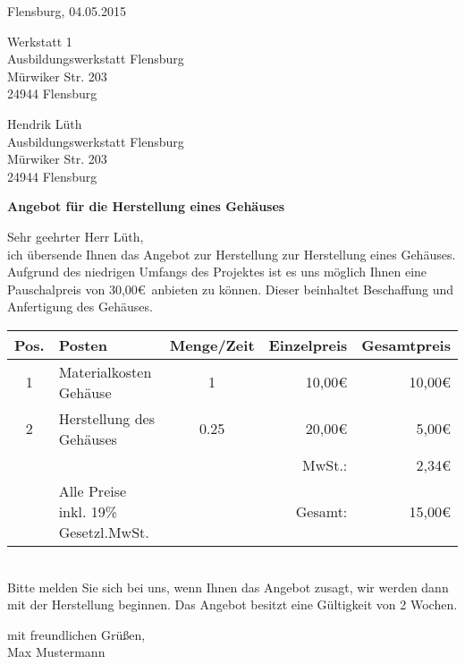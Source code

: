 \pagebreak
Flensburg, 04.05.2015
\begin{flushright}
Werkstatt 1\\
Ausbildungswerkstatt Flensburg\\
Mürwiker Str. 203\\
24944 Flensburg
\end{flushright}
\bigskip
\bigskip
\bigskip
Hendrik Lüth\\
Ausbildungswerkstatt Flensburg\\
Mürwiker Str. 203\\
24944 Flensburg\\
\begin{flushleft}
\bigskip

\textbf{Angebot für die Herstellung eines Gehäuses}
\bigskip
\bigskip

Sehr geehrter Herr Lüth,\\
\bigskip
ich übersende Ihnen das Angebot zur Herstellung zur Herstellung eines Gehäuses.\\
Aufgrund des niedrigen Umfangs des Projektes ist es uns möglich Ihnen eine Pauschalpreis von 30,00\euro\ anbieten zu können. Dieser beinhaltet Beschaffung und Anfertigung des Gehäuses.\\
\bigskip
\begin{tabular}{cp{7cm}cr|r|}
\hline
\multicolumn{1}{|l|}{Pos.} & \multicolumn{1}{l|}{Posten} & \multicolumn{1}{l|}{Menge/Zeit} & Einzelpreis & Gesamtpreis \\ \hline
\multicolumn{1}{|c|}{1} & \multicolumn{1}{l|}{Materialkosten Gehäuse} & \multicolumn{1}{c|}{1} & 10,00\euro & 10,00\euro \\ \hline
\multicolumn{1}{|c|}{2} & \multicolumn{1}{l|}{Herstellung des Gehäuses} & \multicolumn{1}{c|}{0.25} & 20,00\euro & 5,00\euro \\ \hline
 & & & MwSt.: & 2,34\euro \\ \cline{5-5}
                       & Alle Preise inkl. 19\% Gesetzl.MwSt. &                       & Gesamt: & 15,00\euro \\ \cline{5-5} 
\end{tabular}\\
\bigskip
Bitte melden Sie sich bei uns, wenn Ihnen das Angebot zusagt, wir werden dann mit der Herstellung beginnen. Das Angebot besitzt eine Gültigkeit von 2 Wochen.
\bigskip

mit freundlichen Grüßen,\\
\bigskip
Max Mustermann
\end{flushleft}
